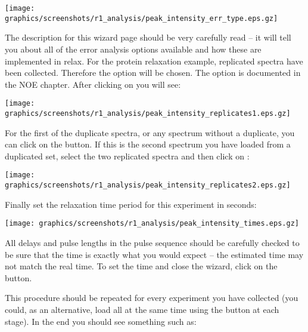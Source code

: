 \begin{minipage}[h]{\linewidth}
\centerline{\texttt{[image: graphics/screenshots/r1\_analysis/peak\_intensity\_err\_type.eps.gz]}}
\end{minipage}

The description for this wizard page should be very carefully read -- it will tell you about all of the error analysis options available and how these are implemented in relax.  For the protein relaxation example, replicated spectra have been collected.  Therefore the option  will be chosen.  The  option is documented in the NOE chapter.  After clicking on  you will see:

\begin{minipage}[h]{\linewidth}
\centerline{\texttt{[image: graphics/screenshots/r1\_analysis/peak\_intensity\_replicates1.eps.gz]}}
\end{minipage}

For the first of the duplicate spectra, or any spectrum without a duplicate, you can click on the  button.  If this is the second spectrum you have loaded from a duplicated set, select the two replicated spectra and then click on :

\begin{minipage}[h]{\linewidth}
\centerline{\texttt{[image: graphics/screenshots/r1\_analysis/peak\_intensity\_replicates2.eps.gz]}}
\end{minipage}

Finally set the relaxation time period for this experiment in seconds:

\begin{minipage}[h]{\linewidth}
\centerline{\texttt{[image: graphics/screenshots/r1\_analysis/peak\_intensity\_times.eps.gz]}}
\end{minipage}

All delays and pulse lengths in the pulse sequence should be carefully checked to be sure that the time is exactly what you would expect -- the estimated time may not match the real time.  To set the time and close the wizard, click on the  button.

This procedure should be repeated for every experiment you have collected (you could, as an alternative, load all at the same time using the  button at each stage).  In the end you should see something such as:

